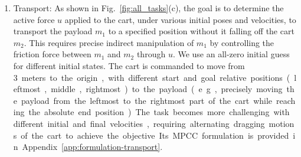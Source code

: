 \begin{enumerate}
\item Transport: As shown in Fig.~\ref{fig:all_tasks}(c), the goal is to determine the active force \(u\) applied to the cart, under various initial poses and velocities, to transport the payload \(m_1\) to a specified position without it falling off the cart \(m_2\). This requires precise indirect manipulation of \(m_1\) by controlling the friction force between \(m_1\) and \(m_2\) through \(u\). We use an all-zero initial guess for different initial states. The cart is commanded to move from \SI{3} meters to the origin, with different start and goal relative positions (leftmost, middle, rightmost) to the payload (e.g., precisely moving the payload from the leftmost to the rightmost part of the cart while reaching the absolute end position). The task becomes more challenging with different initial and final velocities, requiring alternating dragging motions of the cart to achieve the objective. Its MPCC formulation is provided in Appendix~\ref{app:formulation-transport}.



\end{enumerate}
